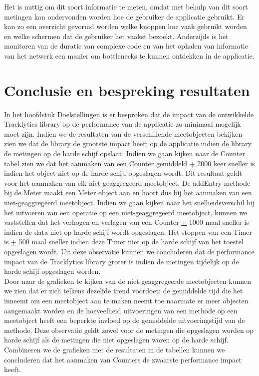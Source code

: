 Het is nuttig om dit soort informatie te meten, omdat met behulp van dit soort metingen kan ondervonden worden hoe de gebruiker de applicatie gebruikt. Er kan zo een overzicht gevormd worden welke knoppen hoe vaak gebruikt worden en welke schermen dat de gebruiker het vaakst bezoekt. Anderzijds is het monitoren van de duratie van complexe code en van het ophalen van informatie van het netwerk een manier om bottlenecks te kunnen ontdekken in de applicatie. 

\section{Conclusie en bespreking resultaten}\label{Section:Conclusie}
In het hoofdstuk Doelstellingen is er besproken dat de impact van de ontwikkelde Tracklytics library op de performance van de applicatie zo minimaal mogelijk moet zijn. Indien we de resultaten van de verschillende meetobjecten bekijken zien we dat de library de grootste impact heeft op de applicatie indien de library de metingen op de harde schijf opslaat. Indien we gaan kijken naar de Counter tabel zien we dat het aanmaken van een Counter gemiddeld \underline{+} 2000 keer sneller is indien het object niet op de harde schijf opgeslagen wordt. Dit resultaat geldt voor het aanmaken van elk niet-geaggregeerd meetobject. De addEntry methode bij de Meter maakt een Meter object aan en hoort dus bij het aanmaken van een niet-geaggregeerd meetobject. Indien we gaan kijken naar het snelheidsverschil bij het uitvoeren van een operatie op een niet-geaggregeerd meetobject, kunnen we vaststellen dat het verhogen en verlagen van een Counter \underline{+} 1000 maal sneller is indien de data niet op harde schijf wordt opgeslagen. Het stoppen van een Timer is \underline{+} 500 maal sneller indien deze Timer niet op de harde schijf van het toestel opgeslagen wordt. Uit deze observatie kunnen we concluderen dat de performance impact van de Tracklytics library groter is indien de metingen tijdelijk op de harde schijf opgeslagen worden. \\

Door naar de grafieken te kijken van de niet-geaggregeerde meetobjecten kunnen we zien dat er zich telkens dezelfde trend voordoet: de gemiddelde tijd die het inneemt om een meetobject aan te maken neemt toe naarmate er meer objecten aangemaakt worden en de hoeveelheid uitvoeringen van een methode op een meetobject heeft een beperkte invloed op de gemiddelde uitvoeringstijd van de methode. Deze observatie geldt zowel voor de metingen die opgeslagen worden op harde schijf als de metingen die niet opgeslagen woren op de harde schijf. Combineren we de grafieken met de resultaten in de tabellen kunnen we concluderen dat het aanmaken van Counters de zwaarste performance impact heeft. \\

